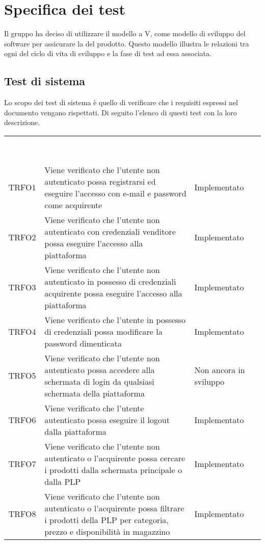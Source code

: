 \section{Specifica dei test}
\label{specificatest}
Il gruppo ha deciso di utilizzare il modello a V, come modello di sviluppo del software per assicurare la  del prodotto. Questo modello illustra le relazioni tra ogni  del ciclo di vita di sviluppo e la fase di test ad essa associata.
\subsection{Test di sistema}
Lo scopo dei test di sistema è quello di verificare che i requisiti espressi nel documento  vengano rispettati. Di seguito l'elenco di questi test con la loro descrizione.
\begin{longtable}{|c| C{10cm} |C{3cm}|}
	\textcolor{white}{\textbf{ID Test}}&
	\textcolor{white}{\textbf{Descrizione}}&
	\textcolor{white}{\textbf{Implementato}}\label{tab:TestSistema1}\\
	TRFO1 & Viene verificato che l'utente non autenticato possa registrarsi ed eseguire l'accesso  con e-mail e password come acquirente & Implementato\\ \hline
	TRFO2 & Viene verificato che l'utente non autenticato con credenziali venditore possa eseguire l'accesso alla piattaforma & Implementato\\ \hline
	TRFO3 & Viene verificato che l'utente non autenticato in possesso di credenziali acquirente possa eseguire l'accesso alla piattaforma & Implementato \\ \hline
	TRFO4 & Viene verificato che l'utente in possesso di credenziali possa modificare la password dimenticata & Implementato\\ \hline
	TRFO5 & Viene verificato che l'utente non autenticato possa accedere alla schermata di login da qualsiasi schermata della piattaforma & Non ancora in sviluppo\\ \hline
	TRFO6 & Viene verificato che l'utente autenticato possa eseguire il logout dalla piattaforma & Implementato\\ \hline
	TRFO7 & Viene verificato che l'utente non autenticato o l'acquirente possa cercare i prodotti dalla schermata principale o dalla PLP & Implementato\\ \hline
	TRFO8 & Viene verificato che l'utente non autenticato o l'acquirente possa filtrare i prodotti della PLP per categoria, prezzo e disponibilità in magazzino & Implementato\\ \hline

\end{longtable}
